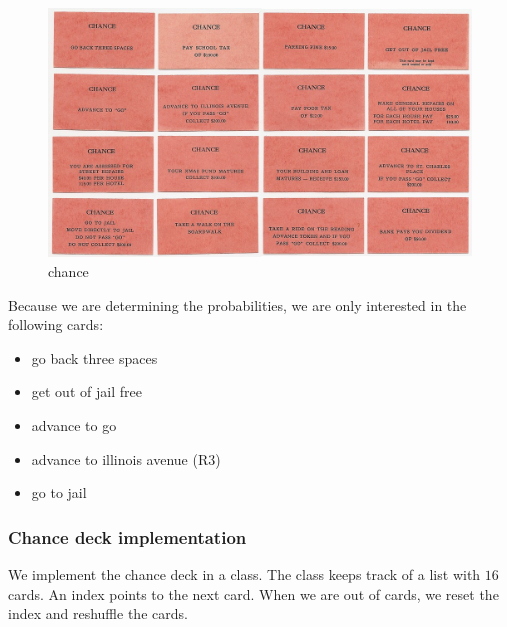\documentclass[11pt]{article}
\makeatletter
\def\maxwidth{\ifdim\Gin@nat@width>\linewidth\linewidth
    \else\Gin@nat@width\fi}
\let\Oldincludegraphics\includegraphics
\renewcommand{\includegraphics}[1]{\Oldincludegraphics[width=.8\maxwidth]{#1}}
\providecommand{\tightlist}{%
      \setlength{\itemsep}{0pt}\setlength{\parskip}{0pt}}
\makeatother
\begin{document}
    \begin{figure}[H]
\centering
\includegraphics{monopoly_3.jpg}
\caption{chance}
\end{figure}

    Because we are determining the probabilities, we are only
interested in the following cards:

\begin{itemize}
\tightlist
\item
  go back three spaces
\item
  get out of jail free
\item
  advance to go
\item
  advance to illinois avenue (R3)
\item
  go to jail
\end{itemize}

    \hypertarget{chance-deck-implementation}{%
\subsubsection{Chance deck
implementation}\label{chance-deck-implementation}}

    We implement the chance deck in a class. The class keeps track of a list
with \(16\) cards. An index points to the next card. When we are out of
cards, we reset the index and reshuffle the cards.
\end{document}
